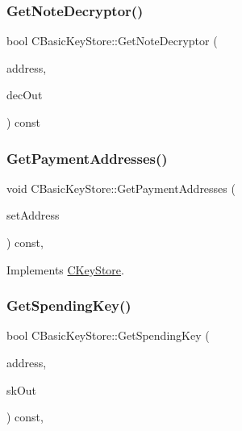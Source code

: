 \subsubsection{\texorpdfstring{Get\+Note\+Decryptor()}{GetNoteDecryptor()}}
{\footnotesize\ttfamily bool C\+Basic\+Key\+Store\+::\+Get\+Note\+Decryptor (\begin{DoxyParamCaption}\item[{const libzcash\+::\+Payment\+Address \&}]{address,  }\item[{Z\+C\+Note\+Decryption \&}]{dec\+Out }\end{DoxyParamCaption}) const\hspace{0.3cm}{\ttfamily [inline]}}

\mbox{\label{class_c_basic_key_store_af02668c3bef8b5a56231505f900a0314}} 
\subsubsection{\texorpdfstring{Get\+Payment\+Addresses()}{GetPaymentAddresses()}}
{\footnotesize\ttfamily void C\+Basic\+Key\+Store\+::\+Get\+Payment\+Addresses (\begin{DoxyParamCaption}\item[{std\+::set$<$ libzcash\+::\+Payment\+Address $>$ \&}]{set\+Address }\end{DoxyParamCaption}) const\hspace{0.3cm}{\ttfamily [inline]}, {\ttfamily [virtual]}}



Implements \mbox{\hyperlink{class_c_key_store_a6186d83956656316f3fe679b4f907866}{C\+Key\+Store}}.

\mbox{\label{class_c_basic_key_store_a0c7997c0413eaa7ec76ec5bef0b40a2a}} 
\subsubsection{\texorpdfstring{Get\+Spending\+Key()}{GetSpendingKey()}}
{\footnotesize\ttfamily bool C\+Basic\+Key\+Store\+::\+Get\+Spending\+Key (\begin{DoxyParamCaption}\item[{const libzcash\+::\+Payment\+Address \&}]{address,  }\item[{libzcash\+::\+Spending\+Key \&}]{sk\+Out }\end{DoxyParamCaption}) const\hspace{0.3cm}{\ttfamily [inline]}, {\ttfamily [virtual]}}



